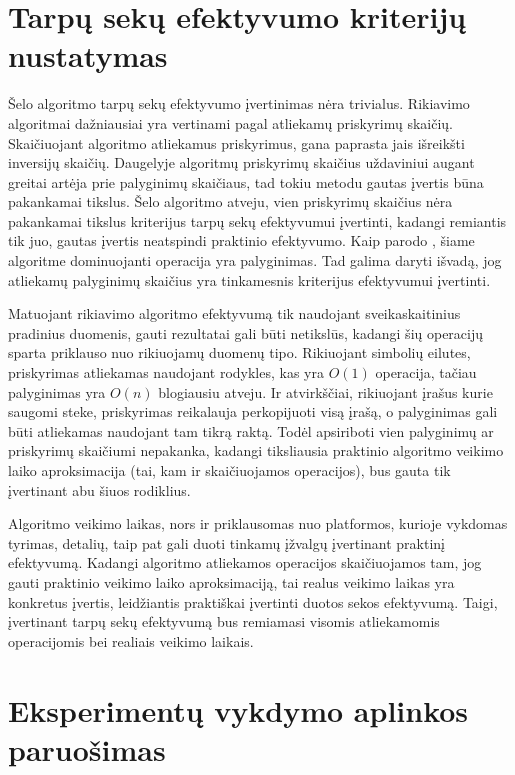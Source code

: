 \documentclass{VUMIFInfKursinis}
\begin{document}
\section{Tarpų sekų efektyvumo kriterijų nustatymas}

Šelo algoritmo tarpų sekų efektyvumo įvertinimas nėra trivialus.
Rikiavimo algoritmai dažniausiai yra vertinami pagal atliekamų priskyrimų skaičių.
Skaičiuojant algoritmo atliekamus priskyrimus, gana paprasta jais išreikšti inversijų skaičių. %
Daugelyje algoritmų priskyrimų skaičius uždaviniui augant greitai artėja prie palyginimų skaičiaus,
tad tokiu metodu gautas įvertis būna pakankamai tikslus.
Šelo algoritmo atveju, vien priskyrimų skaičius nėra pakankamai tikslus kriterijus tarpų sekų efektyvumui įvertinti,
kadangi remiantis tik juo, gautas įvertis neatspindi praktinio efektyvumo.
Kaip parodo \cite{ciura2001best}, šiame algoritme dominuojanti operacija yra palyginimas.
Tad galima daryti išvadą, jog atliekamų palyginimų skaičius yra tinkamesnis kriterijus efektyvumui įvertinti.

Matuojant rikiavimo algoritmo efektyvumą tik naudojant sveikaskaitinius pradinius duomenis, gauti rezultatai gali būti netikslūs,
kadangi šių operacijų sparta priklauso nuo rikiuojamų duomenų tipo.
Rikiuojant simbolių eilutes, priskyrimas atliekamas naudojant rodykles, kas yra $O(1)$ operacija,
tačiau palyginimas yra $O(n)$ blogiausiu atveju.
Ir atvirkščiai, rikiuojant įrašus kurie saugomi steke, priskyrimas reikalauja perkopijuoti visą įrašą,
o palyginimas gali būti atliekamas naudojant tam tikrą raktą.
Todėl apsiriboti vien palyginimų ar priskyrimų skaičiumi nepakanka, kadangi tiksliausia praktinio algoritmo
veikimo laiko aproksimacija (tai, kam ir skaičiuojamos operacijos), bus gauta tik įvertinant abu šiuos rodiklius.

Algoritmo veikimo laikas, nors ir priklausomas nuo platformos, kurioje vykdomas tyrimas, detalių,
taip pat gali duoti tinkamų įžvalgų įvertinant praktinį efektyvumą.
Kadangi algoritmo atliekamos operacijos skaičiuojamos tam, jog gauti praktinio
veikimo laiko aproksimaciją, tai realus veikimo laikas
yra konkretus įvertis, leidžiantis praktiškai įvertinti duotos sekos efektyvumą.
Taigi, įvertinant tarpų sekų efektyvumą bus remiamasi visomis atliekamomis operacijomis bei realiais veikimo laikais.

\section{Eksperimentų vykdymo aplinkos paruošimas}
\end{document}
